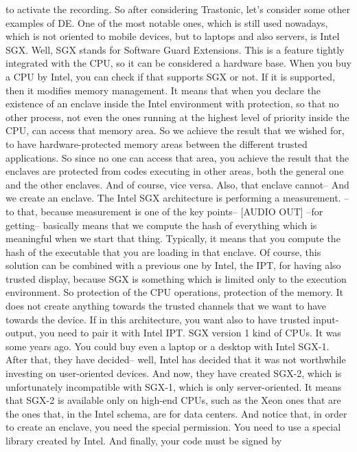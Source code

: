  to activate the recording. So after considering Trastonic, let's consider some
 other examples of DE. One of the most notable ones, which is still used
 nowadays, which is not oriented to mobile devices, but to laptops and also
 servers, is Intel SGX. Well, SGX stands for Software Guard Extensions. This is
 a feature tightly integrated with the CPU, so it can be considered a hardware
 base. When you buy a CPU by Intel, you can check if that supports SGX or not.
 If it is supported, then it modifies memory management. It means that when you
 declare the existence of an enclave inside the Intel environment with
 protection, so that no other process, not even the ones running at the highest
 level of priority inside the CPU, can access that memory area. So we achieve
 the result that we wished for, to have hardware-protected memory areas between
 the different trusted applications. So since no one can access that area, you
 achieve the result that the enclaves are protected from codes executing in
 other areas, both the general one and the other enclaves. And of course, vice
 versa. Also, that enclave cannot-- And we create an enclave. The Intel SGX
 architecture is performing a measurement. --to that, because measurement is
 one of the key points-- [AUDIO OUT] --for getting-- basically means that we
 compute the hash of everything which is meaningful when we start that thing.
 Typically, it means that you compute the hash of the executable that you are
 loading in that enclave. Of course, this solution can be combined with a
 previous one by Intel, the IPT, for having also trusted display, because SGX
 is something which is limited only to the execution environment. So protection
 of the CPU operations, protection of the memory. It does not create anything
 towards the trusted channels that we want to have towards the device. If in
 this architecture, you want also to have trusted input-output, you need to
 pair it with Intel IPT. SGX version 1 kind of CPUs. It was some years ago. You
 could buy even a laptop or a desktop with Intel SGX-1. After that, they have
 decided-- well, Intel has decided that it was not worthwhile investing on
 user-oriented devices. And now, they have created SGX-2, which is
 unfortunately incompatible with SGX-1, which is only server-oriented. It means
 that SGX-2 is available only on high-end CPUs, such as the Xeon ones that are
 the ones that, in the Intel schema, are for data centers. And notice that, in
 order to create an enclave, you need the special permission. You need to use a
 special library created by Intel. And finally, your code must be signed by
